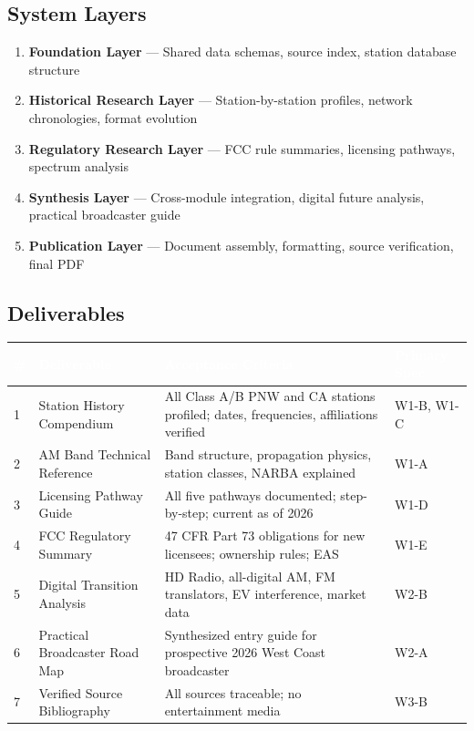 \documentclass[11pt,letterpaper]{article}
\newcommand{\tableheader}[1]{\textbf{\sffamily\textcolor{white}{#1}}}
\begin{document}
\begin{asciibox}
\subsection{System Layers}

\begin{enumerate}[leftmargin=*, label=\textbf{\arabic*.}]
  \item \textbf{Foundation Layer} --- Shared data schemas, source index, station database structure
  \item \textbf{Historical Research Layer} --- Station-by-station profiles, network chronologies, format evolution
  \item \textbf{Regulatory Research Layer} --- FCC rule summaries, licensing pathways, spectrum analysis
  \item \textbf{Synthesis Layer} --- Cross-module integration, digital future analysis, practical broadcaster guide
  \item \textbf{Publication Layer} --- Document assembly, formatting, source verification, final PDF
\end{enumerate}

\subsection{Deliverables}

\begin{center}
\begin{tabularx}{\textwidth}{C{0.5cm}L{3.5cm}XL{3cm}}
\toprule
{}
\tableheader{\#} & \tableheader{Deliverable} & \tableheader{Acceptance Criteria} & \tableheader{Primary Spec} \\
 & Station History Compendium & All Class A/B PNW and CA stations profiled; dates, frequencies, affiliations verified & W1-B, W1-C \\
2 & AM Band Technical Reference & Band structure, propagation physics, station classes, NARBA explained & W1-A \\
3 & Licensing Pathway Guide & All five pathways documented; step-by-step; current as of 2026 & W1-D \\
4 & FCC Regulatory Summary & 47 CFR Part 73 obligations for new licensees; ownership rules; EAS & W1-E \\
5 & Digital Transition Analysis & HD Radio, all-digital AM, FM translators, EV interference, market data & W2-B \\
6 & Practical Broadcaster Road Map & Synthesized entry guide for prospective 2026 West Coast broadcaster & W2-A \\
7 & Verified Source Bibliography & All sources traceable; no entertainment media & W3-B \\
\bottomrule
\end{tabularx}
\end{center}


\end{asciibox}
\end{document}
